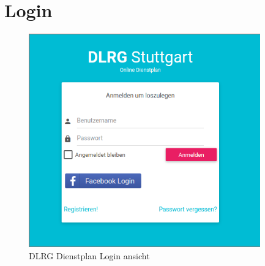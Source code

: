 \chapter{Login}
\label{cha:login}

\begin{figure}[h]
 \begin{addmargin}{-0.2\linewidth}
   \centering 
   \includegraphics[width=10cm]{Bilder/view_login.png}
 \end{addmargin} 
 \caption[DLRG Dienstplan Login ansicht]{DLRG Dienstplan Login ansicht}
 \label{fig:view_login}
\end{figure}